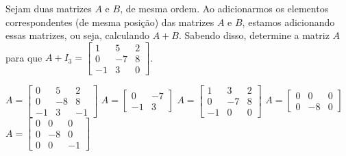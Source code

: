 Sejam duas matrizes $A$ e $B$, de mesma ordem. Ao adicionarmos os elementos correspondentes (de mesma posição) das matrizes $A$ e $B$, estamos adicionando essas matrizes, ou seja, calculando $A+B$. Sabendo disso, determine a matriz $A$ para que $A+I_3=\left[ \begin{array}{ccc}
1 & 5 & 2 \\
0 & -7 & 8 \\
-1 & 3 & 0
\end{array} \right]$.

$A=\left[ \begin{array}{ccc}0 & 5 & 2 \\0 & -8 & 8 \\-1 & 3 & -1\end{array} \right]$
$A=\left[ \begin{array}{cc}0 & -7 \\-1 & 3\end{array} \right]$
$A=\left[ \begin{array}{ccc}1 & 3 & 2 \\0 & -7 & 8 \\-1 & 0 & 0\end{array} \right]$
$A=\left[ \begin{array}{ccc}0 & 0 & 0 \\0 & -8 & 0\end{array} \right]$
$A=\left[ \begin{array}{ccc}0 & 0 & 0 \\0 & -8 & 0 \\0 & 0 & -1\end{array} \right]$


